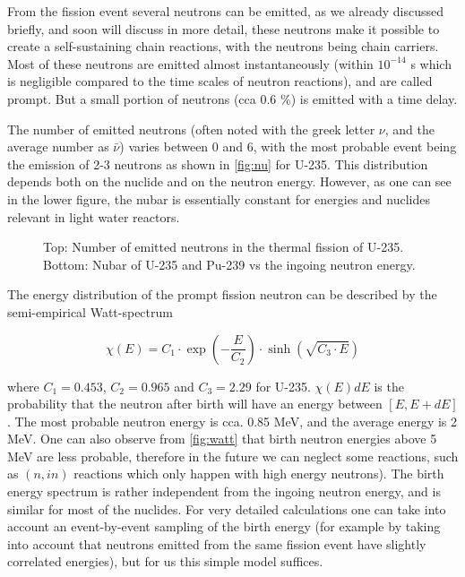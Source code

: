 From the fission event several neutrons can be emitted, as we already discussed briefly, and soon will discuss in more detail, these neutrons make it possible to create a self-sustaining chain reactions, with the neutrons being chain carriers. Most of these neutrons are emitted almost instantaneously (within $10^{-14}$ s which is negligible compared to the time scales of neutron reactions), and are called prompt. But a small portion of neutrons (cca 0.6 \%) is emitted with a time delay.

The number of emitted neutrons (often noted with the greek letter $\nu$, and the average number as $\bar\nu$) varies between 0 and 6, with the most probable event being the emission of 2-3 neutrons as shown in \autoref{fig:nu} for U-235. This distribution depends both on the nuclide and on the neutron energy. However, as one can see in the lower figure, the nubar is essentially constant for energies and nuclides relevant in light water reactors.

\begin{figure}[ht!]
\protect {}\protect
\caption{\label{fig:nu} \footnotesize{Top: Number of emitted neutrons in the thermal fission of U-235. Bottom: Nubar of U-235 and Pu-239 vs the ingoing neutron energy.}}
\end{figure}

The energy distribution of the prompt fission neutron can be described by the semi-empirical Watt-spectrum 

\begin{equation}
\chi(E)=C_1\cdot \exp(-\frac{E}{C_2})\cdot \sinh(\sqrt{C_3\cdot E})
\end{equation}

\noindent where   $C_1 = 0.453$, $C_2 = 0.965$ and $C_3 = 2.29$ for U-235. $\chi(E)dE$ is the probability that the neutron after birth will have an energy between $[E,E+dE]$. The most probable neutron energy is cca. 0.85 MeV, and the average energy is 2 MeV. One can also observe from \autoref{fig:watt} that birth neutron energies above 5 MeV are less probable, therefore in the future we can neglect some reactions, such as $(n,\textit{i}n)$ reactions which only happen with high energy neutrons). The birth energy spectrum is rather independent from the ingoing neutron energy, and is similar for most of the nuclides. For very detailed calculations one can take into account an event-by-event sampling of the birth energy (for example by taking into account that neutrons emitted from the same fission event have slightly correlated energies), but for us this simple model suffices. 

